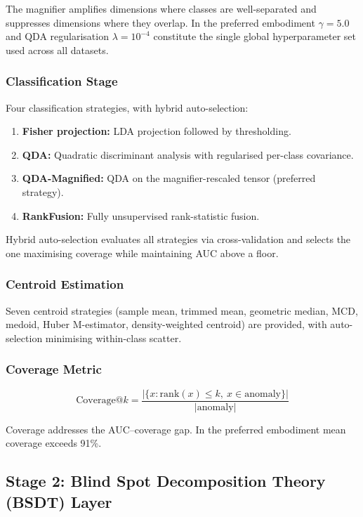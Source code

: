\documentclass[12pt,a4paper]{article}
\begin{document}
The magnifier amplifies dimensions where classes are well-separated and
suppresses dimensions where they overlap. In the preferred embodiment
$\gamma{=}5.0$ and QDA regularisation $\lambda{=}10^{-4}$ constitute
the single global hyperparameter set used across all datasets.

\subsubsection{Classification Stage}

Four classification strategies, with hybrid auto-selection:
\begin{enumerate}[label=(\alph*)]
\item \textbf{Fisher projection:} LDA projection followed by thresholding.
\item \textbf{QDA:} Quadratic discriminant analysis with regularised
per-class covariance.
\item \textbf{QDA-Magnified:} QDA on the magnifier-rescaled tensor
(preferred strategy).
\item \textbf{RankFusion:} Fully unsupervised rank-statistic fusion.
\end{enumerate}

Hybrid auto-selection evaluates all strategies via cross-validation and
selects the one maximising coverage while maintaining AUC above a floor.

\subsubsection{Centroid Estimation}

Seven centroid strategies (sample mean, trimmed mean, geometric median,
MCD, medoid, Huber M-estimator, density-weighted centroid) are provided,
with auto-selection minimising within-class scatter.

\subsubsection{Coverage Metric}

\begin{equation}
\mathrm{Coverage@}k
= \frac{|\{x : \mathrm{rank}(x)\leq k,\ x\in\mathrm{anomaly}\}|}
{|\mathrm{anomaly}|}
\end{equation}

Coverage addresses the AUC--coverage gap. In the preferred embodiment
mean coverage exceeds 91\%.

\subsection{Stage 2: Blind Spot Decomposition Theory (BSDT) Layer}
\label{sec:bsdt}
\end{document}
